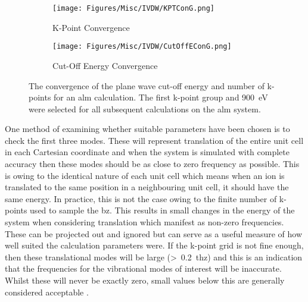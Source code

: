 \begin{figure}
\begin{subfigure}{1\textwidth}
    \centering
    \texttt{[image: Figures/Misc/IVDW/KPTConG.png]}
    \caption{K-Point Convergence}
    \label{fig:kpt_convergence}
    \vspace{10 mm}
\end{subfigure}
\vspace{10 mm}
\begin{subfigure}{1\textwidth}
    \centering
    \texttt{[image: Figures/Misc/IVDW/CutOffEConG.png]}
    \caption{Cut-Off Energy Convergence}
    \label{fig:EC_convergence}
\end{subfigure}
\captionsetup{font = footnotesize, justification = centering}
\caption[The Convergence of the Plane Wave Cut-Off Energy and Number of K-points]{The convergence of the plane wave cut\nobreakdash-off energy and number of k\nobreakdash-points for an \acrshort{alm} calculation. The first k\nobreakdash-point group and \SI{900}{eV} were selected for all subsequent calculations on the \acrshort{alm} system.}
\label{fig:convergence_params}
\end{figure}

One method of examining whether suitable parameters have been chosen is to check the first three modes. These will represent translation of the entire unit cell in each Cartesian coordinate and when the system is simulated with complete accuracy then these modes should be as close to zero frequency as possible. This is owing to the identical nature of each unit cell which means when an ion is translated to the same position in a neighbouring unit cell, it should have the same energy. In practice, this is not the case owing to the finite number of k\nobreakdash-points used to sample the \acrshort{bz}. This results in small changes in the energy of the system when considering translation which manifest as non\nobreakdash-zero frequencies. These can be projected out \DIFdelbegin \DIFdel{~}\DIFdelend \cite{Louck1976} and ignored but can serve as a useful measure of how well suited the calculation parameters were. If the k\nobreakdash-point grid is not fine enough, then these translational modes will be large (>~\SI{0.2}{\acrshort{thz}}) and this is an indication that the frequencies for the vibrational modes of interest will be inaccurate. Whilst these will never be exactly zero, small values below this are generally considered acceptable \DIFdelbegin \DIFdel{~}\DIFdelend \cite{Kendrick2020}.


